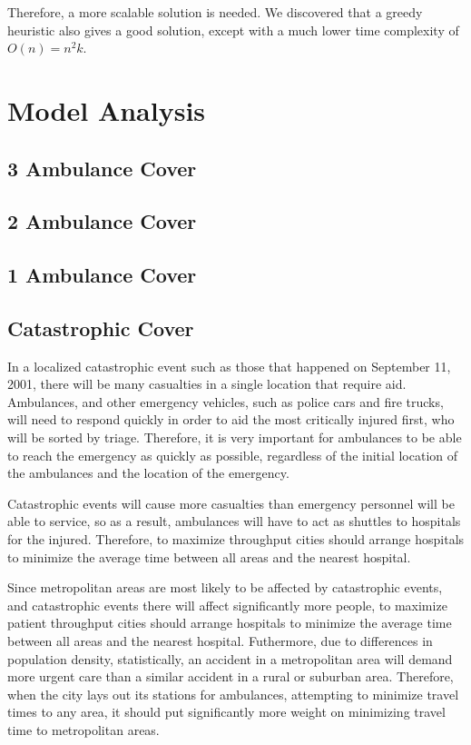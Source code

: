 \documentclass[notitlepage, 12pt]{article}
\begin{document}
Therefore, a more scalable solution is needed. We discovered that a greedy heuristic also gives a good solution,
except with a much lower time complexity of $O(n) = n^2k$.

\section{Model Analysis}

\subsection{3 Ambulance Cover}

\subsection{2 Ambulance Cover}

\subsection{1 Ambulance Cover}

\subsection{Catastrophic Cover}
In a localized catastrophic event such as those that happened on September 11, 2001, there will be
many casualties in a single location that require aid. Ambulances, and other emergency vehicles,
such as police cars and fire trucks, will need to respond quickly in order to aid the most critically
injured first, who will be sorted by triage. Therefore, it is very important for ambulances to be able to
reach the emergency as quickly as possible, regardless of the initial location of the ambulances and the
location of the emergency.

Catastrophic events will cause more casualties than emergency personnel will be able to service, so as a result,
ambulances will have to act as shuttles to hospitals for the injured. Therefore, to maximize throughput
cities should arrange hospitals to minimize the average time between all areas and the nearest
hospital.

Since metropolitan areas are most likely to be affected by catastrophic events, and catastrophic events there
will affect significantly more people, to maximize patient throughput cities should arrange hospitals to minimize
the average time between all areas and the nearest hospital. Futhermore, due to differences in population density,
statistically, an accident in a metropolitan area will demand more urgent care than a similar accident
in a rural or suburban area. Therefore, when the city lays out its stations for ambulances, attempting to minimize
travel times to any area, it should put significantly more weight on minimizing travel time to metropolitan areas.
\end{document}

